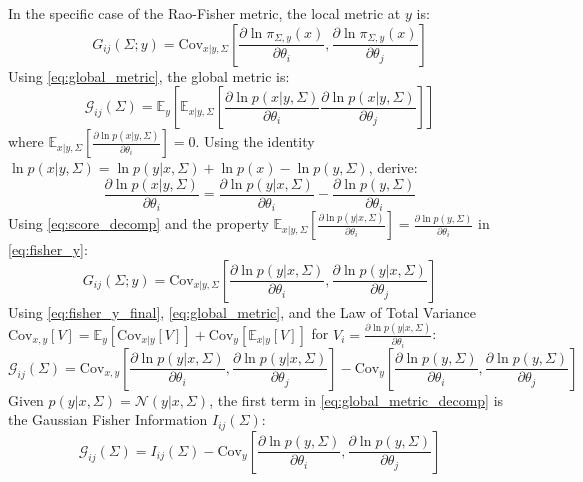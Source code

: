 \documentclass{article}
\begin{document}
In the specific case of the Rao-Fisher metric, the local metric at $y$ is:
\begin{equation} \label{eq:fisher_y}
    G_{ij}(\Sigma; y) = \mathrm{Cov}_{x | y, \Sigma} \left[ \frac{\partial \ln \pi_{\Sigma, y}(x)}{\partial \theta_i}, \frac{\partial \ln \pi_{\Sigma, y}(x)}{\partial \theta_j} \right]
\end{equation}
Using \eqref{eq:global_metric}, the global metric is:
\begin{equation} \label{eq:fisher_global}
    \mathcal{G}_{ij}(\Sigma) = \mathbb{E}_{y} \left[ \mathbb{E}_{x|y, \Sigma} \left[ \frac{\partial \ln p(x|y, \Sigma)}{\partial \theta_i} \frac{\partial \ln p(x|y, \Sigma)}{\partial \theta_j} \right] \right]
\end{equation}
where $\mathbb{E}_{x|y, \Sigma} [ \frac{\partial \ln p(x|y, \Sigma)}{\partial \theta_i} ] = 0$. Using the identity $\ln p(x|y, \Sigma) = \ln p(y|x, \Sigma) + \ln p(x) - \ln p(y, \Sigma)$, derive:
\begin{equation} \label{eq:score_decomp}
    \frac{\partial \ln p(x|y, \Sigma)}{\partial \theta_i} = \frac{\partial \ln p(y|x, \Sigma)}{\partial \theta_i} - \frac{\partial \ln p(y, \Sigma)}{\partial \theta_i}
\end{equation}
Using \eqref{eq:score_decomp} and the property $\mathbb{E}_{x|y, \Sigma} [ \frac{\partial \ln p(y|x, \Sigma)}{\partial \theta_i} ] = \frac{\partial \ln p(y, \Sigma)}{\partial \theta_i}$ in \eqref{eq:fisher_y}:
\begin{equation} \label{eq:fisher_y_final}
    G_{ij}(\Sigma; y) = \mathrm{Cov}_{x|y, \Sigma} \left[ \frac{\partial \ln p(y|x, \Sigma)}{\partial \theta_i}, \frac{\partial \ln p(y|x, \Sigma)}{\partial \theta_j} \right]
\end{equation}
Using \eqref{eq:fisher_y_final}, \eqref{eq:global_metric}, and the Law of Total Variance $\mathrm{Cov}_{x, y}[V] = \mathbb{E}_y[\mathrm{Cov}_{x|y}[V]] + \mathrm{Cov}_y[\mathbb{E}_{x|y}[V]]$ for $V_i = \frac{\partial \ln p(y|x, \Sigma)}{\partial \theta_i}$:
\begin{equation} \label{eq:global_metric_decomp}
    \mathcal{G}_{ij}(\Sigma) = \mathrm{Cov}_{x, y} \left[ \frac{\partial \ln p(y|x, \Sigma)}{\partial \theta_i}, \frac{\partial \ln p(y|x, \Sigma)}{\partial \theta_j} \right] - \mathrm{Cov}_y \left[ \frac{\partial \ln p(y, \Sigma)}{\partial \theta_i}, \frac{\partial \ln p(y, \Sigma)}{\partial \theta_j} \right]
\end{equation}
Given $p(y|x, \Sigma) = \mathcal{N}(y|x, \Sigma)$, the first term in \eqref{eq:global_metric_decomp} is the Gaussian Fisher Information $I_{ij}(\Sigma)$:
\begin{equation} \label{eq:metric_final_form}
    \mathcal{G}_{ij}(\Sigma) = I_{ij}(\Sigma) - \text{Cov}_y \left[ \frac{\partial \ln p(y, \Sigma)}{\partial \theta_i}, \frac{\partial \ln p(y, \Sigma)}{\partial \theta_j} \right]
\end{equation}
\end{document}
